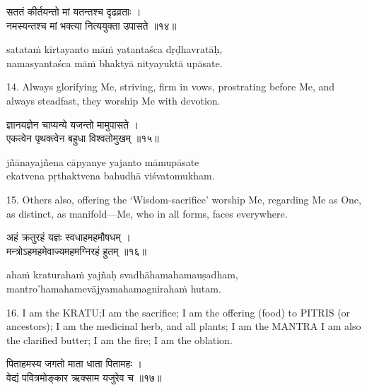 \begin{gitaverse}
सततं कीर्तयन्तो मां यतन्तश्च दृढव्रताः । \\
नमस्यन्तश्च मां भक्त्या नित्ययुक्ता उपासते ॥१४॥
\end{gitaverse}

\begin{transliteration}
satataṁ kīrtayanto māṁ yatantaśca dṛḍhavratāḥ, \\
namasyantaśca māṁ bhaktyā nityayuktā upāsate.
\end{transliteration}

14. Always glorifying Me, striving, firm in vows, prostrating before Me, and
always steadfast, they worship Me with devotion.

\begin{gitaverse}
ज्ञानयज्ञेन चाप्यन्ये यजन्तो मामुपासते । \\
एकत्वेन पृथक्त्वेन बहुधा विश्वतोमुखम् ॥१५॥
\end{gitaverse}

\begin{transliteration}
jñānayajñena cāpyanye yajanto māmupāsate \\
ekatvena pṛthaktvena bahudhā viśvatomukham.
\end{transliteration}

15. Others also, offering the `Wisdom-sacrifice' worship Me, regarding Me as
One, as distinct, as manifold---Me, who in all forms, faces everywhere.

\begin{gitaverse}
अहं क्रतुरहं यज्ञः स्वधाहमहमौषधम् । \\
मन्त्रोऽहमहमेवाज्यमहमग्निरहं हुतम् ॥१६॥
\end{gitaverse}

\begin{transliteration}
ahaṁ kraturahaṁ yajñaḥ svadhāhamahamauṣadham, \\
mantro'hamahamevājyamahamagnirahaṁ hutam.
\end{transliteration}

16. I am the KRATU;\@ I am the sacrifice; I am the offering (food) to PITRIS
(or ancestors); I am the medicinal herb, and all plants; I am the MANTRA I am
also the clarified butter; I am the fire; I am the oblation.

\begin{gitaverse}
पिताहमस्य जगतो माता धाता पितामहः । \\
वेद्यं पवित्रमोङ्कार ऋक्साम यजुरेव च ॥१७॥
\end{gitaverse}

